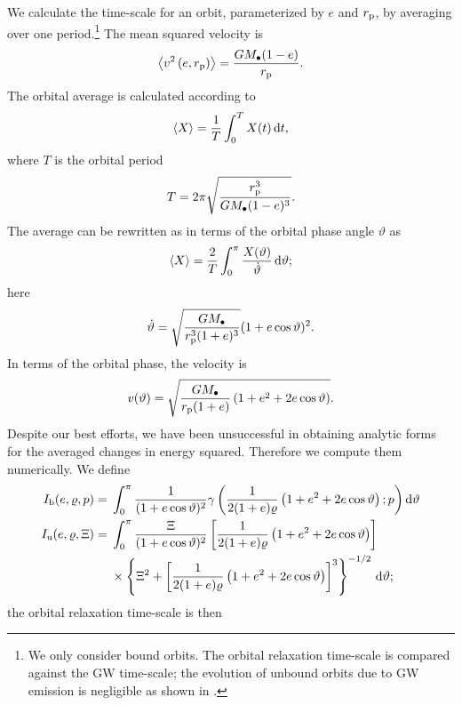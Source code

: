 We calculate the time-scale for an orbit, parameterized by $e$ and $r_\mathrm{p}$, by averaging over one period.\footnote{We only consider bound orbits. The orbital relaxation time-scale is compared against the GW time-scale; the evolution of unbound orbits due to GW emission is negligible as shown in .} The mean squared velocity is
\begin{equation}
\left\langle v^2\left(e,r_\mathrm{p}\right)\right\rangle = \dfrac{GM_\bullet(1 - e)}{r_\mathrm{p}}.
\end{equation}
The orbital average is calculated according to \citep[section 2.2b]{Spitzer1987Jr}
\begin{equation}
\left\langle X\right\rangle = \dfrac{1}{T}\int_{0}^{T}{X(t)}\,\mathrm{d}{t},
\end{equation}
where $T$ is the orbital period
\begin{equation}
T = 2\pi\sqrt{\dfrac{r_\mathrm{p}^3}{GM_\bullet(1-e)^{3}}}.
\end{equation}
The average can be rewritten as in terms of the orbital phase angle $\vartheta$ as
\begin{equation}
\left\langle X\right\rangle = \dfrac{2}{T}\int_{0}^{\pi}{\dfrac{X(\vartheta)}{\dot{\vartheta}}}\,\mathrm{d}{\vartheta};
\end{equation}
here
\begin{equation}
\dot{\vartheta} = \sqrt{\dfrac{GM_\bullet}{r_\mathrm{p}^3(1+e)^3}}(1 + e \cos\vartheta)^2.
\end{equation}
In terms of the orbital phase, the velocity is
\begin{equation}
v(\vartheta) = \sqrt{\dfrac{GM_\bullet}{r_\mathrm{p}(1+e)}\left(1 + e^2 + 2e\cos\vartheta\right)}.
\end{equation}
Despite our best efforts, we have been unsuccessful in obtaining analytic forms for the averaged changes in energy squared. Therefore we compute them numerically. We define
\begin{align}
I_\mathrm{b}(e,\varrho,p) = {} & \int_{0}^{\pi}{\dfrac{1}{(1 + e \cos\vartheta)^2}\gamma\left(\dfrac{1}{2(1+e)\varrho}\left(1+e^2+2e\cos\vartheta\right);p\right)}\,\mathrm{d}{\vartheta} \\
I_\mathrm{u}(e,\varrho,\Xi) = {} & \int_{0}^{\pi} \dfrac{\Xi}{(1 + e \cos\vartheta)^2}\left[\dfrac{1}{2(1+e)\varrho}\left(1+e^2+2e\cos\vartheta\right)\right] \nonumber \\*
 {} & \times \left\{\Xi^2 + \left[\dfrac{1}{2(1+e)\varrho}\left(1+e^2+2e\cos\vartheta\right)\right]^3\right\}^{-1/2} \,\mathrm{d}\vartheta;
\end{align}
the orbital relaxation time-scale is then
